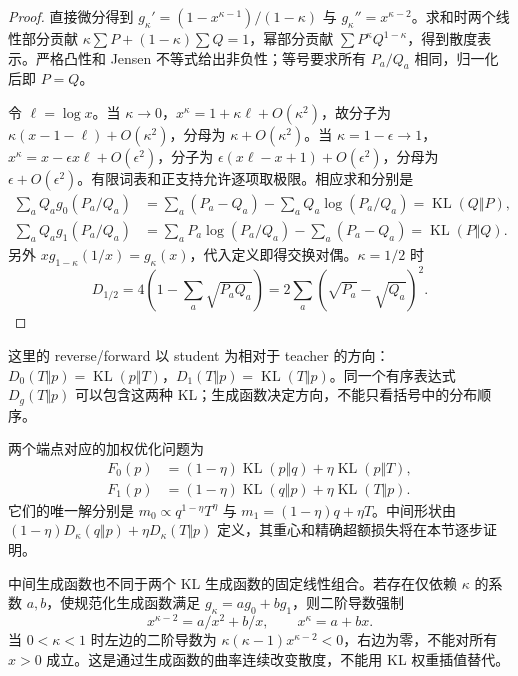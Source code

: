 \documentclass[lang=cn,scheme=chinese,openany]{../book/elegantbook}
\newcommand{\KL}{\operatorname{KL}}
\begin{document}
\begin{proof}
直接微分得到 $g_\kappa'=(1-x^{\kappa-1})/(1-\kappa)$ 与 $g_\kappa''=x^{\kappa-2}$。求和时两个线性部分贡献 $\kappa\sum P+(1-\kappa)\sum Q=1$，幂部分贡献 $\sum P^\kappa Q^{1-\kappa}$，得到散度表示。严格凸性和 Jensen 不等式给出非负性；等号要求所有 $P_a/Q_a$ 相同，归一化后即 $P=Q$。

令 $\ell=\log x$。当 $\kappa\to0$，$x^\kappa=1+\kappa\ell+O(\kappa^2)$，故分子为 $\kappa(x-1-\ell)+O(\kappa^2)$，分母为 $\kappa+O(\kappa^2)$。当 $\kappa=1-\epsilon\to1$，$x^\kappa=x-\epsilon x\ell+O(\epsilon^2)$，分子为 $\epsilon(x\ell-x+1)+O(\epsilon^2)$，分母为 $\epsilon+O(\epsilon^2)$。有限词表和正支持允许逐项取极限。相应求和分别是
\begin{align}
 \sum_aQ_a g_0(P_a/Q_a)
 &=\sum_a(P_a-Q_a)-\sum_aQ_a\log(P_a/Q_a)=\KL(Q\Vert P),\\
 \sum_aQ_a g_1(P_a/Q_a)
 &=\sum_aP_a\log(P_a/Q_a)-\sum_a(P_a-Q_a)=\KL(P\Vert Q).
\end{align}
另外 $xg_{1-\kappa}(1/x)=g_\kappa(x)$，代入定义即得交换对偶。$\kappa=1/2$ 时
\begin{equation}
 D_{1/2}=4\left(1-\sum_a\sqrt{P_aQ_a}\right)
 =2\sum_a(\sqrt{P_a}-\sqrt{Q_a})^2.
\end{equation}
\end{proof}

这里的 reverse/forward 以 student 为相对于 teacher 的方向：$D_0(T\Vert p)=\KL(p\Vert T)$，$D_1(T\Vert p)=\KL(T\Vert p)$。同一个有序表达式 $D_g(T\Vert p)$ 可以包含这两种 KL；生成函数决定方向，不能只看括号中的分布顺序。

两个端点对应的加权优化问题为
\begin{align}
 F_0(p)&=(1-\eta)\KL(p\Vert q)+\eta\KL(p\Vert T),\\
 F_1(p)&=(1-\eta)\KL(q\Vert p)+\eta\KL(T\Vert p).
 \label{eq:divergence-map-barycenter-endpoints}
\end{align}
它们的唯一解分别是 $m_0\propto q^{1-\eta}T^\eta$ 与 $m_1=(1-\eta)q+\eta T$。中间形状由 $(1-\eta)D_\kappa(q\Vert p)+\eta D_\kappa(T\Vert p)$ 定义，其重心和精确超额损失将在本节逐步证明。

中间生成函数也不同于两个 KL 生成函数的固定线性组合。若存在仅依赖 $\kappa$ 的系数 $a,b$，使规范化生成函数满足 $g_\kappa=ag_0+bg_1$，则二阶导数强制
\begin{equation}
 x^{\kappa-2}=a/x^2+b/x,\qquad x^\kappa=a+bx.
\end{equation}
当 $0<\kappa<1$ 时左边的二阶导数为 $\kappa(\kappa-1)x^{\kappa-2}<0$，右边为零，不能对所有 $x>0$ 成立。这是通过生成函数的曲率连续改变散度，不能用 KL 权重插值替代。
\end{document}

